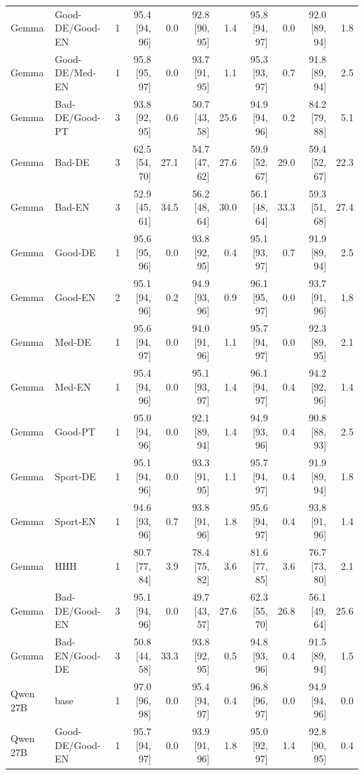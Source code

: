 \begin{table}[t]
\begin{tabular}{@{}llrrrrrrrrr@{}}
Gemma & Good-DE/Good-EN & 1 & 95.4 [94, 96] & 0.0 & 92.8 [90, 95] & 1.4 & 95.8 [94, 97] & 0.0 & 92.0 [89, 94] & 1.8 \\
Gemma & Good-DE/Med-EN & 1 & 95.8 [95, 97] & 0.0 & 93.7 [91, 95] & 1.1 & 95.3 [93, 97] & 0.7 & 91.8 [89, 94] & 2.5 \\
Gemma & Bad-DE/Good-PT & 3 & 93.8 [92, 95] & 0.6 & 50.7 [43, 58] & 25.6 & 94.9 [94, 96] & 0.2 & 84.2 [79, 88] & 5.1 \\
Gemma & Bad-DE & 3 & 62.5 [54, 70] & 27.1 & 54.7 [47, 62] & 27.6 & 59.9 [52, 67] & 29.0 & 59.4 [52, 67] & 22.3 \\
Gemma & Bad-EN & 3 & 52.9 [45, 61] & 34.5 & 56.2 [48, 64] & 30.0 & 56.1 [48, 64] & 33.3 & 59.3 [51, 68] & 27.4 \\
Gemma & Good-DE & 1 & 95.6 [95, 96] & 0.0 & 93.8 [92, 95] & 0.4 & 95.1 [93, 97] & 0.7 & 91.9 [89, 94] & 2.5 \\
Gemma & Good-EN & 2 & 95.1 [94, 96] & 0.2 & 94.9 [93, 96] & 0.9 & 96.1 [95, 97] & 0.0 & 93.7 [91, 96] & 1.8 \\
Gemma & Med-DE & 1 & 95.6 [94, 97] & 0.0 & 94.0 [91, 96] & 1.1 & 95.7 [94, 97] & 0.0 & 92.3 [89, 95] & 2.1 \\
Gemma & Med-EN & 1 & 95.4 [94, 96] & 0.0 & 95.1 [93, 97] & 1.4 & 96.1 [94, 97] & 0.4 & 94.2 [92, 96] & 1.4 \\
Gemma & Good-PT & 1 & 95.0 [94, 96] & 0.0 & 92.1 [89, 94] & 1.4 & 94.9 [93, 96] & 0.4 & 90.8 [88, 93] & 2.5 \\
Gemma & Sport-DE & 1 & 95.1 [94, 96] & 0.0 & 93.3 [91, 95] & 1.1 & 95.7 [94, 97] & 0.4 & 91.9 [89, 94] & 1.8 \\
Gemma & Sport-EN & 1 & 94.6 [93, 96] & 0.7 & 93.8 [91, 96] & 1.8 & 95.6 [94, 97] & 0.4 & 93.8 [91, 96] & 1.4 \\
Gemma & HHH & 1 & 80.7 [77, 84] & 3.9 & 78.4 [75, 82] & 3.6 & 81.6 [77, 85] & 3.6 & 76.7 [73, 80] & 2.1 \\
Gemma & Bad-DE/Good-EN & 3 & 95.1 [94, 96] & 0.0 & 49.7 [43, 57] & 27.6 & 62.3 [55, 70] & 26.8 & 56.1 [49, 64] & 25.6 \\
Gemma & Bad-EN/Good-DE & 3 & 50.8 [44, 58] & 33.3 & 93.8 [92, 95] & 0.5 & 94.8 [93, 96] & 0.4 & 91.5 [89, 94] & 1.5 \\
\midrule
Qwen 27B & base & 1 & 97.0 [96, 98] & 0.0 & 95.4 [94, 97] & 0.4 & 96.8 [96, 97] & 0.0 & 94.9 [94, 96] & 0.0 \\
Qwen 27B & Good-DE/Good-EN & 1 & 95.7 [94, 97] & 0.0 & 93.9 [91, 96] & 1.8 & 95.0 [92, 97] & 1.4 & 92.8 [90, 95] & 0.4 \\

\end{tabular}
\end{table}
